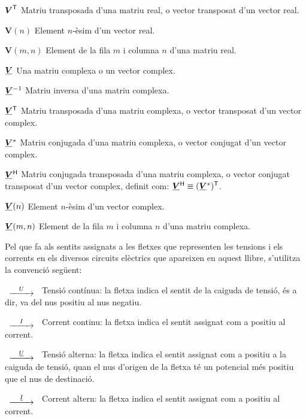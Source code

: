 \begin{list}{}
    \item[$\boldsymbol{V}^\mathrm{\textsf{T}}$] Matriu transposada d'una matriu real, o vector
    transposat d'un vector real.
    \item[$\boldsymbol{V}(n)$] Element $n$-èsim d'un vector real.
    \item[$\boldsymbol{V}(m,n)$] Element de la fila $m$ i columna $n$ d'una matriu real.
    \item[$\mcmplx{V}$] Una matriu complexa o un vector complex.
    \item[$\mcmplx{V}^{-1}$] Matriu inversa d'una matriu complexa.
    \item[$\transpose{\mcmplx{V}}$] Matriu transposada d'una matriu complexa, o vector
    transposat d'un vector complex.
    \item[$\mcmplx{V}^*$] Matriu conjugada d'una matriu complexa, o vector
    conjugat d'un vector complex.
    \item[$\hermit{V}$] Matriu conjugada transposada d'una matriu complexa, o vector
    conjugat transposat d'un vector complex, definit com: $\hermit{V} \equiv
    \transpose{(\mcmplx{V}^*)}$.
    \item[$\mcmplx{V}(n)$] Element $n$-èsim d'un vector complex.
    \item[$\mcmplx{V}(m,n)$] Element de la fila $m$ i columna $n$ d'una matriu complexa.
\end{list}

Pel que fa als sentits assignats a les fletxes que representen les
tensions i els corrents en els diversos circuits elèctrics que
apareixen en aquest llibre, s'utilitza la convenció següent:

\begin{list}{}
{\setlength{\labelwidth}{15mm} \setlength{\leftmargin}{20mm}
\setlength{\labelsep}{5mm}}
    \item[$\begin{CD} @>U>> \end{CD}$] Tensió contínua: la fletxa indica el sentit
    de la caiguda de tensió, és a dir, va del nus positiu al nus negatiu.
    \item[$\begin{CD} @>I>> \end{CD}$] Corrent
    continu: la fletxa indica el sentit  assignat com a positiu al corrent.
    \item[$\begin{CD} @>\cmplx{U}>> \end{CD}$] Tensió alterna: la fletxa indica el
    sentit assignat com a positiu a la caiguda de tensió, quan el nus d'origen de la fletxa
    té un potencial  més positiu que el nus de destinació.
    \item[$\begin{CD} @>\cmplx{I}>> \end{CD}$] Corrent altern: la fletxa
    indica el sentit  assignat com a positiu al corrent.
\end{list}

